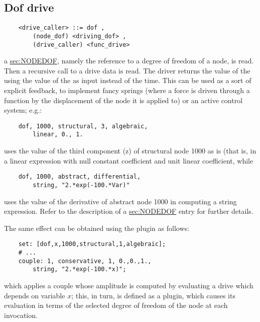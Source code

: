 \subsection{Dof drive}\label{sec:DRIVE-DOF}
\begin{verbatim}
    <drive_caller> ::= dof ,
        (node_dof) <driving_dof> ,
        (drive_caller) <func_drive>
\end{verbatim}
a \hyperref{\kw{node\_dof}}{\kw{node\_dof} (see Section~}{)}{sec:NODEDOF}, 
namely the reference to a degree of freedom of a node, is read. 
Then a recursive call to a drive data is read. 
The driver returns the value of the  
 using the value of the 
 as input instead of the time. 
This can be used as a sort of explicit feedback, to implement fancy
springs (where a force is driven through a function by the displacement
of the node it is applied to) or an active control system; e.g.:
\begin{verbatim}
    dof, 1000, structural, 3, algebraic, 
        linear, 0., 1.
\end{verbatim}
uses the value of the third component (z) of structural node 1000 
as is (that is, in a linear expression with null constant coefficient 
and unit linear coefficient, while
\begin{verbatim}
    dof, 1000, abstract, differential, 
        string, "2.*exp(-100.*Var)"
\end{verbatim}
uses the value of the derivative of abstract node 1000 in computing 
a string expression.
Refer to the description of a 
\hyperref{\kw{node\_dof}}{\kw{node\_dof} (see Section~}{)}{sec:NODEDOF}
entry for further details.

\noindent
The same effect can be obtained using the  plugin as follows:
\begin{verbatim}
    set: [dof,x,1000,structural,1,algebraic];
    # ...
    couple: 1, conservative, 1, 0.,0.,1.,
        string, "2.*exp(-100.*x)";
\end{verbatim}
which applies a couple whose amplitude is computed by evaluating
a  drive which depends on variable $x$; this, in turn,
is defined as a  plugin, which causes its evaluation
in terms of the selected degree of freedom of the node at each invocation.


